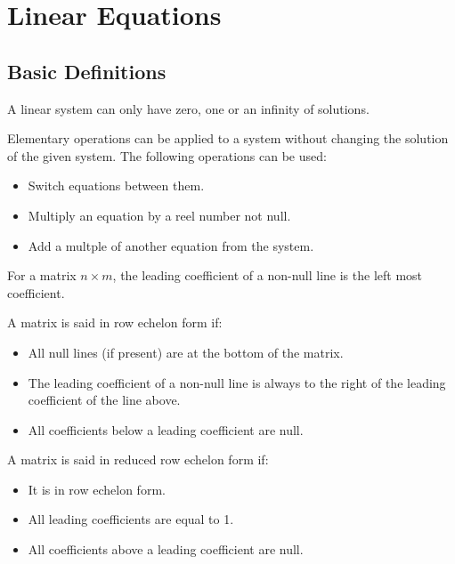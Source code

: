 \chapter{Linear Equations}

\section{Basic Definitions}

\begin{theorem}
    A linear system can only have zero, one or an infinity of solutions.
\end{theorem}

\begin{theorem}
    Elementary operations can be applied to a system without changing the solution of the given system. The following operations can be used:

    \begin{itemize}[itemsep=1pt,label=$\circ$]
        \item Switch equations between them.
        \item Multiply an equation by a reel number not null.
        \item Add a multple of another equation from the system.
    \end{itemize}
\end{theorem}

\begin{definition}
    For a matrix $n \times m$, the leading coefficient of a non-null line is the left most coefficient.
\end{definition}

\begin{definition}
    A matrix is said in row echelon form if:

    \begin{itemize}[itemsep=1pt,label=$\circ$]
        \item All null lines (if present) are at the bottom of the matrix.
        \item The leading coefficient of a non-null line is always to the right of the leading coefficient of the line above.
        \item All coefficients below a leading coefficient are null.
    \end{itemize}
\end{definition}

\begin{definition}
    A matrix is said in reduced row echelon form if:

    \begin{itemize}[itemsep=1pt,label=$\circ$]
        \item It is in row echelon form.
        \item All leading coefficients are equal to 1.
        \item All coefficients above a leading coefficient are null.
    \end{itemize}
\end{definition}

